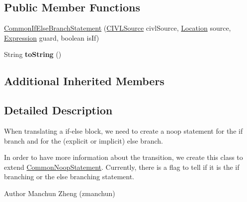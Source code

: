 \subsection*{Public Member Functions}
\begin{DoxyCompactItemize}
\item 
\hyperlink{classedu_1_1udel_1_1cis_1_1vsl_1_1civl_1_1model_1_1common_1_1statement_1_1CommonIfElseBranchStatement_a4c22f956efc14375d817ae54ea963bd5}{Common\+If\+Else\+Branch\+Statement} (\hyperlink{interfaceedu_1_1udel_1_1cis_1_1vsl_1_1civl_1_1model_1_1IF_1_1CIVLSource}{C\+I\+V\+L\+Source} civl\+Source, \hyperlink{interfaceedu_1_1udel_1_1cis_1_1vsl_1_1civl_1_1model_1_1IF_1_1location_1_1Location}{Location} source, \hyperlink{interfaceedu_1_1udel_1_1cis_1_1vsl_1_1civl_1_1model_1_1IF_1_1expression_1_1Expression}{Expression} guard, boolean is\+If)
\item 
\hypertarget{classedu_1_1udel_1_1cis_1_1vsl_1_1civl_1_1model_1_1common_1_1statement_1_1CommonIfElseBranchStatement_a811d680afac86b0e5bb5b8494c828c45}{}String {\bfseries to\+String} ()\label{classedu_1_1udel_1_1cis_1_1vsl_1_1civl_1_1model_1_1common_1_1statement_1_1CommonIfElseBranchStatement_a811d680afac86b0e5bb5b8494c828c45}

\end{DoxyCompactItemize}
\subsection*{Additional Inherited Members}


\subsection{Detailed Description}
When translating a if-\/else block, we need to create a noop statement for the if branch and for the (explicit or implicit) else branch. 

In order to have more information about the transition, we create this class to extend \hyperlink{classedu_1_1udel_1_1cis_1_1vsl_1_1civl_1_1model_1_1common_1_1statement_1_1CommonNoopStatement}{Common\+Noop\+Statement}. Currently, there is a flag to tell if it is the if branching or the else branching statement.

\begin{DoxyAuthor}{Author}
Manchun Zheng (zmanchun) 
\end{DoxyAuthor}


